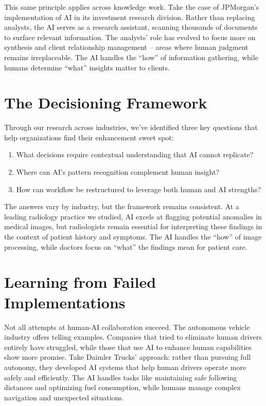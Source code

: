 \documentclass[
  Letterpaper,
]{scrbook}
\providecommand{\tightlist}{%
  \setlength{\itemsep}{0pt}\setlength{\parskip}{0pt}}\usepackage{longtable,booktabs,array}
\begin{document}
This same principle applies across knowledge work. Take the case of
JPMorgan's implementation of AI in its investment research division.
Rather than replacing analysts, the AI serves as a research assistant,
scanning thousands of documents to surface relevant information. The
analysts' role has evolved to focus more on synthesis and client
relationship management -- areas where human judgment remains
irreplaceable. The AI handles the ``how'' of information gathering,
while humans determine ``what'' insights matter to clients.

\section{The Decisioning Framework}\label{the-decisioning-framework}

Through our research across industries, we've identified three key
questions that help organizations find their enhancement sweet spot:

\begin{enumerate}
\def\labelenumi{\arabic{enumi}.}
\tightlist
\item
  What decisions require contextual understanding that AI cannot
  replicate?
\item
  Where can AI's pattern recognition complement human insight?
\item
  How can workflow be restructured to leverage both human and AI
  strengths?
\end{enumerate}

The answers vary by industry, but the framework remains consistent. At a
leading radiology practice we studied, AI excels at flagging potential
anomalies in medical images, but radiologists remain essential for
interpreting these findings in the context of patient history and
symptoms. The AI handles the ``how'' of image processing, while doctors
focus on ``what'' the findings mean for patient care.

\section{Learning from Failed
Implementations}\label{learning-from-failed-implementations}

Not all attempts at human-AI collaboration succeed. The autonomous
vehicle industry offers telling examples. Companies that tried to
eliminate human drivers entirely have struggled, while those that use AI
to enhance human capabilities show more promise. Take Daimler Trucks'
approach: rather than pursuing full autonomy, they developed AI systems
that help human drivers operate more safely and efficiently. The AI
handles tasks like maintaining safe following distances and optimizing
fuel consumption, while humans manage complex navigation and unexpected
situations.
\end{document}
